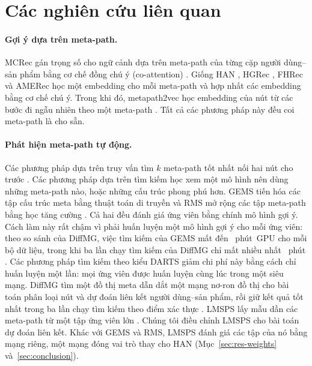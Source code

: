 \section{Các nghiên cứu liên quan}
\label{sec:related}

\paragraph{Gợi ý dựa trên meta-path.} MCRec gán trọng số cho ngữ cảnh dựa trên meta-path
của từng cặp người dùng--sản phẩm bằng cơ chế đồng chú ý (co-attention) \citep{hu2018leveraging}.
Giống HAN \citep{wang2019heterogeneous}, HGRec \citep{shi2020hgrec}, FHRec \citep{mu2021fhrec} và
AMERec \citep{yan2021attention} học một embedding cho mỗi meta-path và hợp nhất
các embedding bằng cơ chế chú ý. Trong khi đó, metapath2vec học embedding của nút từ các bước đi ngẫu
nhiên theo một meta-path \citep{dong2017metapath2vec}. Tất cả các phương pháp này đều coi
meta-path là cho sẵn.

\paragraph{Phát hiện meta-path tự động.} Các phương pháp dựa trên truy vấn tìm $k$ meta-path tốt nhất nối hai nút cho trước \citep{zhu2020topk}. Các phương pháp dựa trên tìm kiếm
học xem một mô hình nên dùng những meta-path nào, hoặc những cấu trúc phong phú hơn. GEMS tiến hóa
các tập cấu trúc meta bằng thuật toán di truyền \citep{han2020genetic} và RMS mở
rộng các tập meta-path bằng học tăng cường \citep{ning2022automatic}. Cả hai đều đánh giá ứng
viên bằng chính mô hình gợi ý. Cách làm này rất chậm vì phải huấn luyện một mô hình gợi ý cho mỗi ứng viên: theo
so sánh của DiffMG, việc tìm kiếm của GEMS mất  đến ~phút~GPU
cho mỗi bộ dữ liệu, trong khi ba lần chạy tìm kiếm của DiffMG chỉ mất nhiều nhất
~phút \citep[Bảng~5]{ding2021diffmg}. Các phương pháp tìm kiếm theo
kiểu DARTS \citep{liu2019darts} giảm chi phí này bằng cách chỉ huấn luyện một lần: mọi ứng viên được
huấn luyện cùng lúc trong một siêu mạng. DiffMG tìm một đồ thị
meta dẫn dắt một mạng nơ-ron đồ thị cho bài toán phân loại nút và dự đoán liên kết
người dùng--sản phẩm, rồi giữ kết quả tốt nhất trong ba lần chạy tìm kiếm theo điểm xác thực
\citep{ding2021diffmg}. LMSPS lấy mẫu dần các meta-path từ một tập ứng viên lớn
\citep{li2024longrange}. Chúng tôi điều chỉnh LMSPS cho bài toán dự đoán liên kết. Khác với GEMS
và RMS, LMSPS đánh giá các tập của nó bằng mạng riêng, một mạng đóng vai trò thay cho HAN
(Mục~\ref{sec:res-weights} và~\ref{sec:conclusion}).

